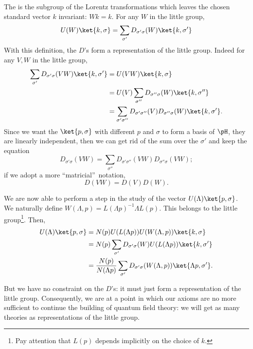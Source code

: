 The  is the subgroup of the Lorentz transformations which leaves the chosen standard vector $k$ invariant: $Wk=k$. For any $W$ in the little group,
\[
	U(W)\ket{k,\sigma}=\sum_{\sigma'}D_{\sigma'\sigma}(W)\ket{k,\sigma'}
\]
With this definition, the $D$'s form a representation of the little group. Indeed for any $V,W$ in the little group,
\begin{equation}
	\begin{split}
		\sum_{\sigma'}D_{\sigma'\sigma}(VW)\ket{k,\sigma'}&=U(VW)\ket{k,\sigma}\\
		&=U(V)\sum_{\sigma''}D_{\sigma''\sigma}(W)\ket{k,\sigma''}\\
		&=\sum_{\sigma'\sigma''}D_{\sigma'\sigma''}(V)D_{\sigma''\sigma}(W)
		\ket{k,\sigma'}.
	\end{split}
\end{equation}
Since we want the $\ket{p,\sigma}$ with different $p$ and $\sigma$ to form a basis of $\pH$, they are linearly independent, then we can get rid of the sum over the $\sigma'$ and keep the equation
\[
	D_{\sigma'\sigma}(VW)=\sum_{\sigma''}D_{\sigma'\sigma''}(VW)D_{\sigma''\sigma}(VW);
\]
if we adopt a more ``matricial''\ notation,
\begin{equation}
	D(VW)=D(V)D(W).
\end{equation}

We are now able to perform a step in the study of the vector $U(\Lambda)\ket{p,\sigma}$. We naturally define $W(\Lambda,p)=L(\Lambda p)^{-1}\Lambda L(p)$. This belongs to the little group\footnote{Pay attention that $L(p)$ depends implicitly on the choice of $k$.}. Then,
\begin{equation}
	\begin{split}
		U(\Lambda)\ket{p,\sigma}&=N(p)U(L(\Lambda p))U(W(\Lambda,p))\ket{k,\sigma}\\
		&=N(p)\sum_{\sigma'}D_{\sigma'\sigma}(W)U(L(\Lambda p))\ket{k,\sigma'}\\
		&=\frac{N(p)}{N(\Lambda p)}\sum_{\sigma'}D_{\sigma'\sigma}(W(\Lambda,p))
		\ket{\Lambda p,\sigma'}.
	\end{split}
\end{equation}

But we have no constraint on the $D$'s: it must just form a representation of the little group. Consequently, we are at a point in which our axioms are no more sufficient to continue the building of quantum field theory: we will get as many theories as representations of the little group.

